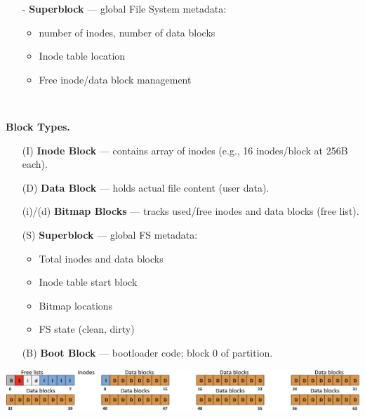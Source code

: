 \documentclass[8pt]{extarticle}
\begin{document}
\begin{minipage}[htp]{0.5\textwidth}
\begin{minipage}[t]{0.55\textwidth}
\begin{itemize}[noitemsep,topsep=0pt]
    \item[-] \textbf{Superblock} — global File System metadata:
        \begin{itemize}[noitemsep,topsep=0pt]
            \item number of inodes, number of data blocks
            \item Inode table location
            \item Free inode/data block management
        \end{itemize}
\end{itemize}
\end{minipage}\\[2px]
\begin{minipage}[htp]{1\textwidth}
\noindent\textbf{Block Types.}\\
\hspace*{-35px}
\begin{minipage}[t]{0.5\textwidth}
\begin{itemize}[noitemsep,topsep=0pt]
    \item[] (I) \textbf{Inode Block} — contains array of inodes (e.g., 16 inodes/block at 256B each).
    \item[] (D) \textbf{Data Block} — holds actual file content (user data).
    \item[] (i)/(d) \textbf{Bitmap Blocks} — tracks used/free inodes and data blocks (free list).
\end{itemize}
\end{minipage}%
\hspace*{-10px}
\begin{minipage}[t]{0.5\textwidth}
\begin{itemize}[noitemsep,topsep=0pt]
    \item[(S)] \textbf{Superblock} — global FS metadata:
        \begin{itemize}[noitemsep,topsep=0pt]
            \item Total inodes and data blocks
            \item Inode table start block
            \item Bitmap locations
            \item FS state (clean, dirty)
        \end{itemize}
    \item[(B)] \textbf{Boot Block} — bootloader code; block 0 of partition.
\end{itemize}
\end{minipage}
\includegraphics[width=1\textwidth]{images/blocks.png}
\end{minipage}
\end{minipage}
\end{document}
